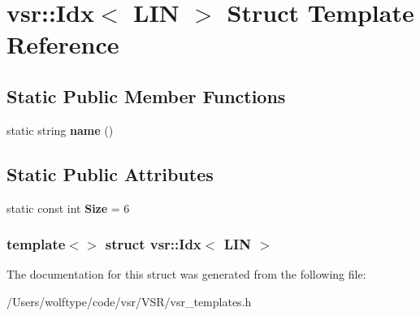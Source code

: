\hypertarget{structvsr_1_1_idx_3_01_l_i_n_01_4}{\section{vsr\-:\-:Idx$<$ L\-I\-N $>$ Struct Template Reference}
\label{structvsr_1_1_idx_3_01_l_i_n_01_4}
}
\subsection*{Static Public Member Functions}
\begin{DoxyCompactItemize}
\item 
\hypertarget{structvsr_1_1_idx_3_01_l_i_n_01_4_a3b0b3f8093527811ba91620f4c6b0762}{static string {\bfseries name} ()}\label{structvsr_1_1_idx_3_01_l_i_n_01_4_a3b0b3f8093527811ba91620f4c6b0762}

\end{DoxyCompactItemize}
\subsection*{Static Public Attributes}
\begin{DoxyCompactItemize}
\item 
\hypertarget{structvsr_1_1_idx_3_01_l_i_n_01_4_a62e9501fe82404be3e75af1dc5f525b4}{static const int {\bfseries Size} = 6}\label{structvsr_1_1_idx_3_01_l_i_n_01_4_a62e9501fe82404be3e75af1dc5f525b4}

\end{DoxyCompactItemize}
\subsubsection*{template$<$$>$ struct vsr\-::\-Idx$<$ L\-I\-N $>$}



The documentation for this struct was generated from the following file\-:\begin{DoxyCompactItemize}
\item 
/\-Users/wolftype/code/vsr/\-V\-S\-R/vsr\-\_\-templates.\-h\end{DoxyCompactItemize}
